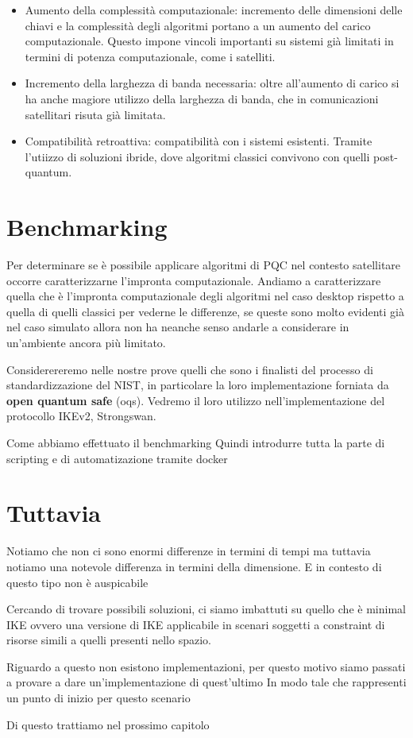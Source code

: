 \begin{itemize}
    \item  Aumento della complessità computazionale: incremento delle dimensioni delle chiavi e la complessità degli algoritmi portano a un aumento del carico
    computazionale. Questo impone vincoli importanti su sistemi già limitati in termini di potenza computazionale, come i satelliti. 
    \item Incremento della larghezza di banda necessaria: oltre all'aumento di carico si ha anche magiore utilizzo della larghezza di banda, che in comunicazioni satellitari risuta già limitata.
    \item Compatibilità retroattiva: compatibilità con i sistemi esistenti. Tramite l'utiizzo di soluzioni ibride, dove algoritmi classici convivono con quelli post-quantum.
\end{itemize}

\section{Benchmarking}

Per determinare se è possibile applicare algoritmi di PQC nel contesto satellitare occorre caratterizzarne l'impronta computazionale.
Andiamo a caratterizzare quella che è l'impronta computazionale degli algoritmi nel caso desktop rispetto a quella di quelli classici per 
vederne le differenze, se queste sono molto evidenti già nel caso simulato allora non ha neanche senso andarle a considerare in un'ambiente
ancora più limitato.

Considerereremo nelle nostre prove quelli che sono i finalisti del processo di standardizzazione del NIST, in particolare la loro implementazione
forniata da \textbf{open quantum safe} (oqs). Vedremo il loro utilizzo nell'implementazione del protocollo IKEv2, Strongswan.

Come abbiamo effettuato il benchmarking
Quindi introdurre tutta la parte di scripting e di automatizazione tramite docker



\section{Tuttavia}

Notiamo che non ci sono enormi differenze in termini di tempi ma tuttavia notiamo una notevole differenza
in termini della dimensione. E in contesto di questo tipo non è auspicabile

Cercando di trovare possibili soluzioni, ci siamo imbattuti su quello che è minimal IKE ovvero
una versione di IKE applicabile in scenari soggetti a constraint di risorse simili a quelli presenti nello spazio.

Riguardo a questo non esistono implementazioni, per questo motivo siamo passati a provare a dare un'implementazione di quest'ultimo
In modo tale che rappresenti un punto di inizio per questo scenario

Di questo trattiamo nel prossimo capitolo



